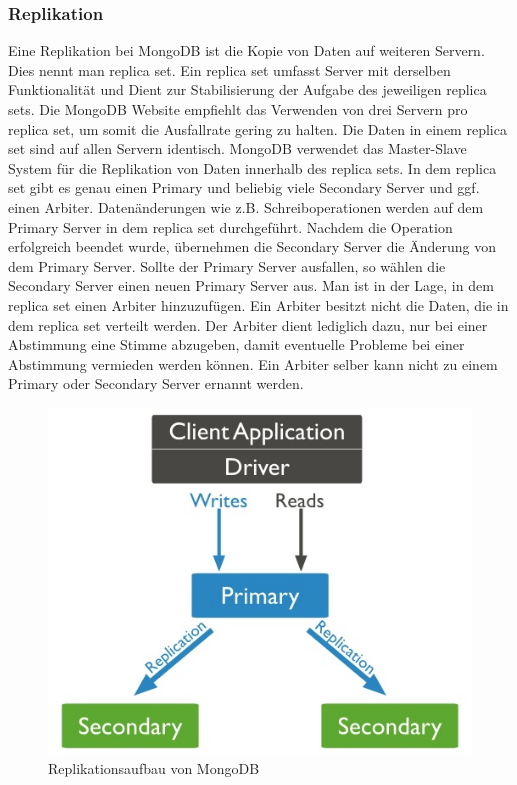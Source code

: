 \subsubsection{Replikation}
Eine Replikation bei MongoDB ist die Kopie von Daten auf weiteren Servern. Dies nennt man replica set. Ein replica set umfasst Server mit derselben Funktionalität und Dient zur Stabilisierung der Aufgabe des jeweiligen replica sets. Die MongoDB Website empfiehlt das Verwenden von drei Servern pro replica set, um somit die Ausfallrate gering zu halten. Die Daten in einem replica set sind auf allen Servern identisch. MongoDB verwendet das Master-Slave System für die Replikation von Daten innerhalb des replica sets. In dem replica set gibt es genau einen Primary und beliebig viele Secondary Server und ggf. einen Arbiter. Datenänderungen wie z.B. Schreiboperationen werden auf dem Primary Server in dem replica set durchgeführt. Nachdem die Operation erfolgreich beendet wurde, übernehmen die Secondary Server die Änderung von dem Primary Server. Sollte der Primary Server ausfallen, so wählen die Secondary Server einen neuen Primary Server aus. Man ist in der Lage, in dem replica set einen Arbiter hinzuzufügen. Ein Arbiter besitzt nicht die Daten, die in dem replica set verteilt werden. Der Arbiter dient lediglich dazu, nur bei einer Abstimmung eine Stimme abzugeben, damit eventuelle Probleme bei einer Abstimmung vermieden werden können. Ein Arbiter selber kann nicht zu einem Primary oder Secondary Server ernannt werden.
\\
\begin{figure}[hbt]
	\centering
	\includegraphics[scale=1]{images/replica-set-read-write-operations-primary.jpg}  
	\caption{Replikationsaufbau von MongoDB}
\end{figure}
\\
